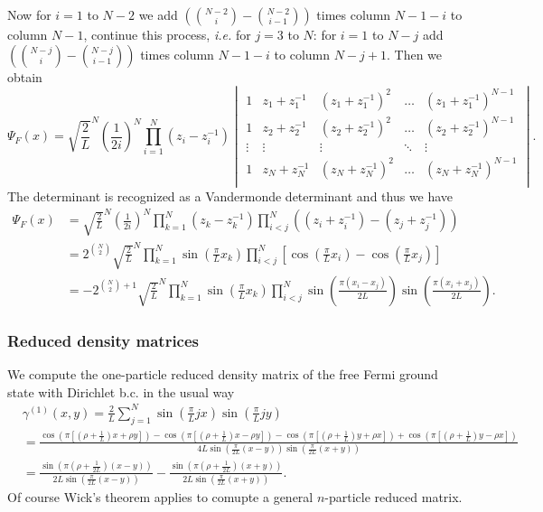 \documentclass[a4paper,11pt]{article}
\newcommand{\ie}{\emph{i.e.} }
\numberwithin{equation}{section}
\begin{document}
	Now for $ i=1 $ to $ N-2 $ we add $ \left(\binom{N-2}{i}-\binom{N-2}{i-1}\right) $ times column $ N-1-i $ to column $ N-1 $, continue this process, \ie for $ j=3 $ to $ N $: for $ i=1 $ to $ N-j $ add  $ \left(\binom{N-j}{i}-\binom{N-j}{i-1}\right) $ times column $ N-1-i $ to column $ N-j+1 $. Then we obtain \begin{equation}
	\Psi_F(x)=\sqrt{\frac{2}{L}}^N\left(\frac{1}{2i}\right)^N\prod_{i=1}^{N}(z_i-z_i^{-1})\begin{vmatrix}
	1&z_1+z_1^{-1}&(z_1+z_1^{-1})^2&\ldots&(z_1+z_1^{-1})^{N-1}\\
	1&z_2+z_2^{-1}&(z_2+z_2^{-1})^2&\ldots&(z_2+z_2^{-1})^{N-1}\\
	\vdots&\vdots&\vdots&\ddots&\vdots\\
	1&z_N+z_N^{-1}&(z_N+z_N^{-1})^2&\ldots&(z_N+z_N^{-1})^{N-1}\\
	\end{vmatrix}.
	\end{equation}
	The determinant is recognized as a Vandermonde determinant and thus we have \begin{equation}
	\begin{aligned}
	\Psi_F(x)&=\sqrt{\frac{2}{L}}^N\left(\frac{1}{2i}\right)^N\prod_{k=1}^{N}(z_k-z_k^{-1})\prod_{i<j}^{N}\left((z_i+z_i^{-1})-(z_j+z_j^{-1})\right)\\
	&=2^{\binom{N}{2}}\sqrt{\frac{2}{L}}^N\prod_{k=1}^{N}\sin\left(\frac{\pi}{L}x_k\right)\prod_{i<j}^{N}\left[\cos\left(\frac{\pi}{L}x_i\right)-\cos\left(\frac{\pi}{L}x_j\right)\right]\\
	&=-2^{\binom{N}{2}+1}\sqrt{\frac{2}{L}}^N\prod_{k=1}^{N}\sin\left(\frac{\pi}{L}x_k\right)\prod_{i<j}^{N}\sin\left(\frac{\pi(x_i-x_j)}{2L}\right)\sin\left(\frac{\pi(x_i+x_j)}{2L}\right)
	.
	\end{aligned}
	\end{equation}

	\subsubsection{Reduced density matrices}
	We compute the one-particle reduced density matrix of the free Fermi ground state with Dirichlet b.c. in the usual way\begin{equation}
	\begin{aligned}
	&\gamma^{(1)}(x,y)=\frac{2}{L}\sum_{j=1}^{N}\sin\left(\frac{\pi}{L}jx\right)\sin\left(\frac{\pi}{L} jy\right)\\
	&=\frac{\cos\left(\pi\left[ \left(\rho+\frac{1}{L}\right)x+\rho y\right]\right)-\cos\left(\pi \left[\left(\rho+\frac{1}{L}\right)x-\rho y\right]\right)-\cos\left(\pi \left[\left(\rho+\frac{1}{L}\right)y+\rho x\right]\right)+\cos\left(\pi \left[\left(\rho+\frac{1}{L}\right)y-\rho x\right]\right)}{4L\sin\left(\frac{\pi}{2L}(x-y)\right)\sin\left(\frac{\pi}{2L}(x+y)\right)}\\
	&=\frac{\sin\left(\pi\left(\rho+\frac{1}{2L}\right)(x-y)\right)}{2L\sin\left(\frac{\pi}{2L}(x-y)\right)}-\frac{\sin\left(\pi\left(\rho+\frac{1}{2L}\right)(x+y)\right)}{2L\sin\left(\frac{\pi}{2L}(x+y)\right)}.
	\end{aligned}
	\end{equation}
	Of course Wick's theorem applies to comupte a general $ n $-particle reduced matrix.
\end{document}

